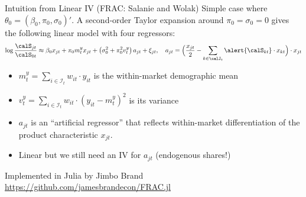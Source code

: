 \begin{frame}{Intuition from Linear IV (FRAC: Salanie and Wolak)}
Simple case where $\theta_0 = (\beta_0, \pi_0, \sigma_0)'$. A second-order Taylor expansion around $\pi_0 = \sigma_0 = 0$ gives the following linear model with four regressors:
\begin{align*}
    \log\frac{\calS_{jt}}{\calS_{0t}} \approx \beta_0 x_{jt} + \pi_0 m_t^y x_{jt} + \left(\sigma_0^2+  \pi_0^2 v_t^y \right) a_{jt} + \xi_{jt}, \quad a_{jt} = \Big(\frac{x_{jt}}{2} - \sum_{k \in \calJ_t} \alert{\calS_{kt}} \cdot x_{kt}\Big) \cdot x_{jt}
\end{align*}
\begin{itemize}
    \item $m_t^y = \sum_{i \in \mathcal{I}_t} w_{it} \cdot y_{it}$ is the within-market demographic mean
    \item $v_t^y = \sum_{i \in \mathcal{I}_t} w_{it} \cdot (y_{it} - m_t^y)^2$ is its variance
    \item $a_{jt}$ is an ``artificial regressor'' that reflects within-market differentiation of the product characteristic $x_{jt}$.\\
    \item Linear but we still need an IV for $a_{jt}$ (\alert{endogenous shares!})
\end{itemize}
Implemented in Julia by Jimbo Brand  \url{https://github.com/jamesbrandecon/FRAC.jl}
\end{frame}


